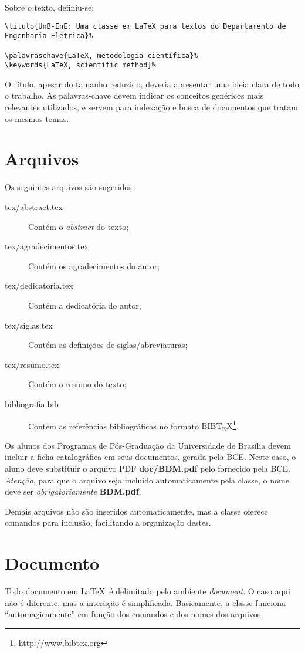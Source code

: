 Sobre o texto, definiu-se:
\begin{verbatim}
\titulo{UnB-EnE: Uma classe em LaTeX para textos do Departamento de Engenharia Elétrica}%

\palavraschave{LaTeX, metodologia científica}%
\keywords{LaTeX, scientific method}%
\end{verbatim}

O título, apesar do tamanho reduzido, deveria apresentar uma ideia clara de todo o trabalho. As
palavras-chave devem indicar os conceitos genéricos mais relevantes utilizados, e servem para 
indexação e busca de documentos que tratam os mesmos temas.


\section{Arquivos}
Os seguintes arquivos são sugeridos:
\begin{description}%
	\item[tex/abstract.tex] Contém o \emph{abstract} do texto;%
	\item[tex/agradecimentos.tex] Contém os agradecimentos do autor;%
	\item[tex/dedicatoria.tex] Contém a dedicatória do autor;%
	\item[tex/siglas.tex] Contém as definições de siglas/abreviaturas;%
	\item[tex/resumo.tex] Contém o resumo do texto;%
	\item[bibliografia.bib] Contém as referências bibliográficas no formato
	${\mathrm{B{\scriptstyle{IB}}T_{\displaystyle E}X}}$\footnote{\url{http://www.bibtex.org}}.%
\end{description}%

Os alunos dos Programas de Pós-Graduação da Universidade de Brasília devem incluir a ficha 
catalográfica em seus documentos, gerada pela \acrfull{BCE}. Neste caso, o aluno deve substituir o 
arquivo PDF \textbf{doc/BDM.pdf} pelo fornecido pela \acrshort{BCE}. \emph{Atenção}, para que o 
arquivo seja incluido automaticamente pela classe, o nome deve ser \emph{obrigatoriamente} 
\textbf{BDM.pdf}.%

Demais arquivos não são inseridos automaticamente, mas a classe oferece comandos para inclusão,
facilitando a organização destes.

\section{Documento}
Todo documento em \LaTeX\ é delimitado pelo ambiente \emph{document}. O caso aqui não é diferente,
mas a interação é simplificada. Basicamente, a classe \unbene funciona ``automagicamente'' em 
função dos comandos e dos nomes dos arquivos.


